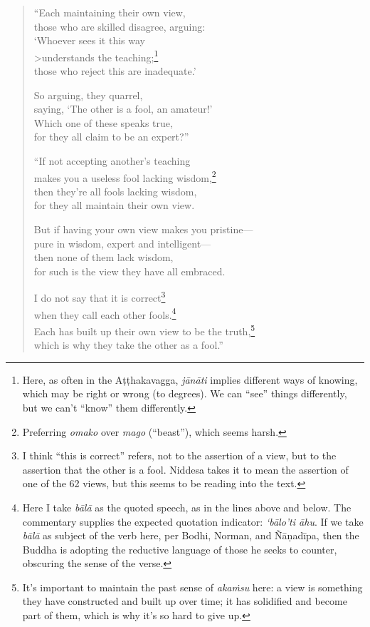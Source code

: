 \documentclass[12pt,openany]{book}%
\begin{document}
\begin{verse}%
“Each maintaining their own view, \\
those who are skilled disagree, arguing: \\
‘Whoever sees it this way \\>understands the teaching;\footnote{Here, as often in the \textsanskrit{Aṭṭhakavagga}, \textit{\textsanskrit{jānāti}} implies different ways of knowing, which may be right or wrong (to degrees). We can “see” things differently, but we can’t “know” them differently. } \\
those who reject this are inadequate.’ 

So arguing, they quarrel, \\
saying, ‘The other is a fool, an amateur!’ \\
Which one of these speaks true, \\
for they all claim to be an expert?” 

“If not accepting another’s teaching \\
makes you a useless fool lacking wisdom,\footnote{Preferring \textit{omako} over \textit{mago} (“beast”), which seems harsh. } \\
then they’re all fools lacking wisdom, \\
for they all maintain their own view. 

But if having your own view makes you pristine—\\
pure in wisdom, expert and intelligent—\\
then none of them lack wisdom, \\
for such is the view they have all embraced. 

I do not say that it is correct\footnote{I think “this is correct” refers, not to the assertion of a view, but to the assertion that the other is a fool. Niddesa takes it to mean the assertion of one of the 62 views, but this seems to be reading into the text. } \\
when they call each other fools.\footnote{Here I take \textit{\textsanskrit{bālā}} as the quoted speech, as in the lines above and below. The commentary supplies the expected quotation indicator: \textit{‘\textsanskrit{bālo}’ti \textsanskrit{āhu}}. If we take \textit{\textsanskrit{bālā}} as subject of the verb here, per Bodhi, Norman, and \textsanskrit{Ñāṇadīpa}, then the Buddha is adopting the reductive language of those he seeks to counter, obscuring the sense of the verse. } \\
Each has built up their own view to be the truth,\footnote{It’s important to maintain the past sense of \textit{\textsanskrit{akaṁsu}} here: a view is something they have constructed and built up over time; it has solidified and become part of them, which is why it’s so hard to give up. } \\
which is why they take the other as a fool.” 


\end{verse}
\end{document}

